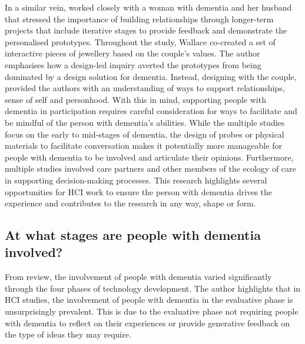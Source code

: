 In a similar vein, \cite{wallace_design-led_2013} worked closely with a woman with dementia and her husband that stressed the importance of building relationships through longer-term projects that include iterative stages to provide feedback and demonstrate the personalised prototypes. Throughout the study, Wallace co-created a set of interactive pieces of jewellery based on the couple's values. The author emphasises how a design-led inquiry averted the prototypes from being dominated by a design solution for dementia. Instead, designing with the couple, provided the authors with an understanding of ways to support relationships, sense of self and personhood. With this in mind, supporting people with dementia in participation requires careful consideration for ways to facilitate and be mindful of the person with dementia's abilities. While the multiple studies focus on the early to mid-stages of dementia, the design of probes or physical materials to facilitate conversation makes it potentially more manageable for people with dementia to be involved and articulate their opinions. Furthermore, multiple studies involved care partners and other members of the ecology of care in supporting decision-making processes. This research highlights several opportunities for HCI work to ensure the person with dementia drives the experience and contributes to the research in any way, shape or form.

\subsection{At what stages are people with dementia involved?}
\label{BL:DevelopmentPhases}
From \cite{suijkerbuijk_active_2019} review, the involvement of people with dementia varied significantly through the four phases of technology development. The author highlights that in HCI studies, the involvement of people with dementia in the evaluative phase is unsurprisingly prevalent. This is due to the evaluative phase not requiring people with dementia to reflect on their experiences or provide generative feedback on the type of ideas they may require. 

